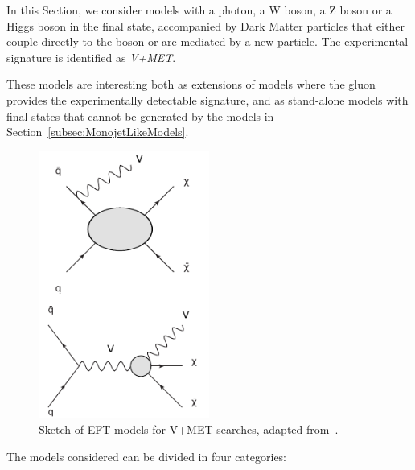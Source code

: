 
In this Section, we consider models with a photon, a W boson, a Z boson or a Higgs boson in the final state, 
accompanied by Dark Matter particles that either couple directly to the boson or are mediated by 
a new particle. The experimental signature is identified as \textit{V+MET}. 

These models are interesting both as extensions of models where the gluon provides 
the experimentally detectable signature, 
and as stand-alone models with final states that cannot be generated by the models in
Section~\ref{subsec:MonojetLikeModels}.


\begin{figure}[h!]
  \centering
    \includegraphics[width=0.5\textwidth]{figures/VPlusMET_EFT}
  \caption{Sketch of EFT models for V+MET searches, adapted from~\citep{Nelson:2013pqa}. \label{fig:VPlusMET_EFT}}
\end{figure}
% 
The models considered can be divided in four categories:
